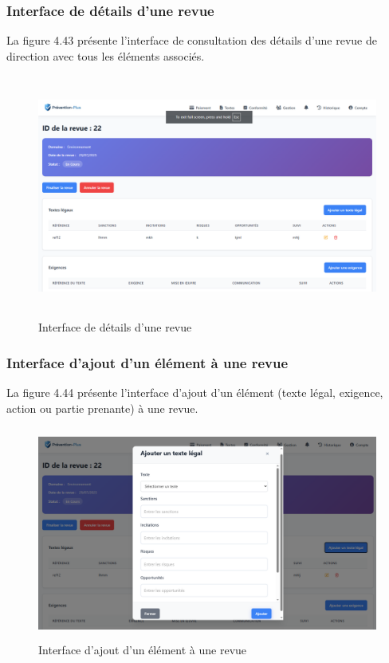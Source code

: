 \subsubsection{Interface de détails d'une revue}
\noindent La figure 4.43 présente l'interface de consultation des détails d'une revue de direction avec tous les éléments associés.

\begin{figure}[H]
    \centering
    \includegraphics[width=13cm,height=8cm]{images/revuedetails.PNG}
    \caption{Interface de détails d'une revue}
\end{figure}

\subsubsection{Interface d'ajout d'un élément à une revue}
\noindent La figure 4.44 présente l'interface d'ajout d'un élément (texte légal, exigence, action ou partie prenante) à une revue.

\begin{figure}[H]
    \centering
    \includegraphics[width=12cm,height=7cm]{images/addelementmodal.PNG}
    \caption{Interface d'ajout d'un élément à une revue}
\end{figure}

